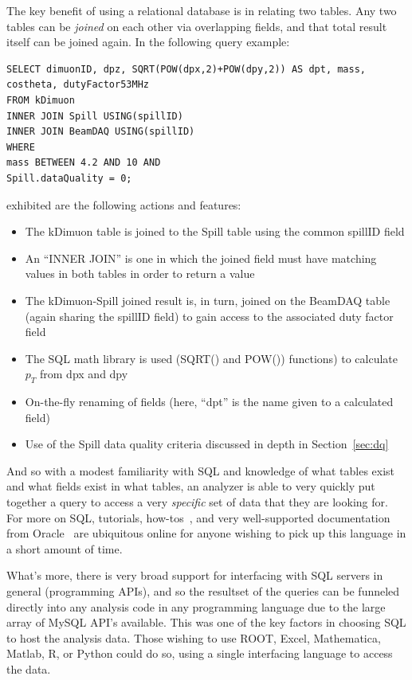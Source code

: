 The key benefit of using a relational database is in relating two tables. Any two tables can be \emph{joined} on each other via overlapping fields, and that total result itself can be joined again. In the following query example:
\begin{lstlisting}
SELECT dimuonID, dpz, SQRT(POW(dpx,2)+POW(dpy,2)) AS dpt, mass, costheta, dutyFactor53MHz
FROM kDimuon
INNER JOIN Spill USING(spillID)
INNER JOIN BeamDAQ USING(spillID)
WHERE 
mass BETWEEN 4.2 AND 10 AND
Spill.dataQuality = 0;
\end{lstlisting}
exhibited are the following actions and features:
\begin{itemize}
	\item The kDimuon table is joined to the Spill table using the common spillID field
	\item An ``INNER JOIN'' is one in which the joined field must have matching values in both tables in order to return a value
	\item The kDimuon-Spill joined result is, in turn, joined on the BeamDAQ table (again sharing the spillID field) to gain access to the associated duty factor field
	\item The SQL math library is used (SQRT() and POW()) functions) to calculate $p_T$ from dpx and dpy
	\item On-the-fly renaming of fields (here, ``dpt'' is the name given to a calculated field)
	\item Use of the Spill data quality criteria discussed in depth in Section~\ref{sec:dq}
\end{itemize}
And so with a modest familiarity with SQL and knowledge of what tables exist and what fields exist in what tables, an analyzer is able to very quickly put together a query to access a very \emph{specific} set of data that they are looking for. For more on SQL, tutorials, how-tos~\cite{ww3school}, and very well-supported documentation from Oracle~\cite{oracle:mysql} are ubiquitous online for anyone wishing to pick up this language in a short amount of time. 

What's more, there is very broad support for interfacing with SQL servers in general (programming APIs), and so the resultset of the queries can be funneled directly into any analysis code in any programming language due to the large array of MySQL API's available. This was one of the key factors in choosing SQL to host the analysis data. Those wishing to use ROOT, Excel, Mathematica, Matlab, R, or Python could do so, using a single interfacing language to access the data.

